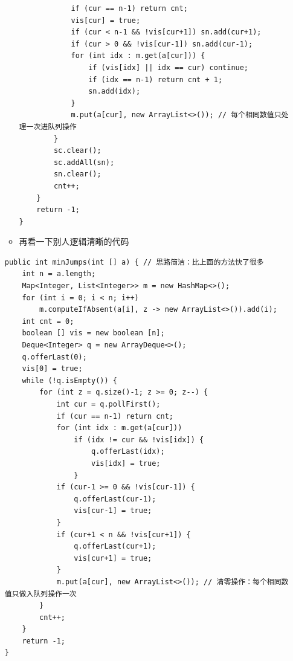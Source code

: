 \documentclass[9pt, b5paaper]{book}
\begin{document}
\begin{enumerate}
\begin{itemize}
\begin{verbatim}
            if (cur == n-1) return cnt;
            vis[cur] = true;
            if (cur < n-1 && !vis[cur+1]) sn.add(cur+1);
            if (cur > 0 && !vis[cur-1]) sn.add(cur-1);
            for (int idx : m.get(a[cur])) {
                if (vis[idx] || idx == cur) continue;
                if (idx == n-1) return cnt + 1;
                sn.add(idx);
            }
            m.put(a[cur], new ArrayList<>()); // 每个相同数值只处理一次进队列操作
        }
        sc.clear();
        sc.addAll(sn);
        sn.clear();
        cnt++;
    }
    return -1;
}
\end{verbatim}
\item 再看一下别人逻辑清晰的代码
\end{itemize}
\begin{verbatim}
public int minJumps(int [] a) { // 思路简洁：比上面的方法快了很多
    int n = a.length;
    Map<Integer, List<Integer>> m = new HashMap<>();
    for (int i = 0; i < n; i++) 
        m.computeIfAbsent(a[i], z -> new ArrayList<>()).add(i);
    int cnt = 0;
    boolean [] vis = new boolean [n];
    Deque<Integer> q = new ArrayDeque<>();
    q.offerLast(0);
    vis[0] = true;
    while (!q.isEmpty()) {
        for (int z = q.size()-1; z >= 0; z--) {
            int cur = q.pollFirst();
            if (cur == n-1) return cnt;
            for (int idx : m.get(a[cur])) 
                if (idx != cur && !vis[idx]) {
                    q.offerLast(idx);
                    vis[idx] = true;
                }
            if (cur-1 >= 0 && !vis[cur-1]) {
                q.offerLast(cur-1);
                vis[cur-1] = true;
            }
            if (cur+1 < n && !vis[cur+1]) {
                q.offerLast(cur+1);
                vis[cur+1] = true;
            }
            m.put(a[cur], new ArrayList<>()); // 清零操作：每个相同数值只做入队列操作一次
        }
        cnt++;
    }
    return -1;
}
\end{verbatim}
\end{enumerate}
\end{document}
